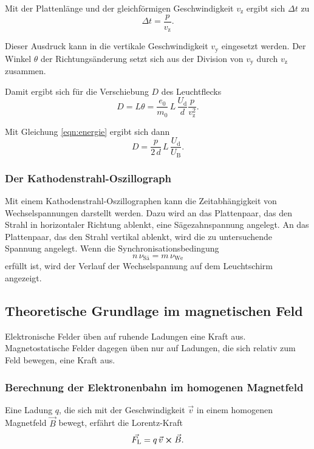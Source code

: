 \noindent Mit der Plattenlänge und der 
gleichförmigen Geschwindigkeit $v_\text{z}$ ergibt sich $\Delta t$ zu
\begin{equation*}
    \Delta t = \frac{p}{v_\text{z}}.
\end{equation*}

\noindent Dieser Ausdruck kann in die vertikale 
Geschwindigkeit $v_\text{y}$ eingesetzt werden. Der Winkel $\theta$ der 
Richtungsänderung setzt sich aus der Division von 
$v_\text{y}$ durch $v_\text{z}$ zusammen. 

\noindent Damit ergibt sich für die Verschiebung $D$ des Leuchtflecks 
\begin{equation*}
    D = L \theta = \frac{e_\text{0}}{m_\text{0}} \, L \, \frac{U_\text{d}}{d} \frac{p}{v_\text{z}^2}.
\end{equation*}

\noindent Mit Gleichung \eqref{eqn:energie} ergibt sich dann 
\begin{equation}
    D = \frac{p}{2\, d} \, L \, \frac{U_\text{d}}{U_\text{B}}.
    \label{eqn:leuchtfleck}
\end{equation}

\subsubsection{Der Kathodenstrahl-Oszillograph}
Mit einem Kathodenstrahl-Oszillographen kann die Zeitabhängigkeit
von Wechselspannungen darstellt werden.
Dazu wird an das Plattenpaar, das den Strahl in horizontaler
Richtung ablenkt, eine Sägezahnspannung angelegt. An das Plattenpaar,
das den Strahl vertikal ablenkt, wird die zu untersuchende
Spannung angelegt. Wenn die Synchronisationsbedingung
\begin{equation*}
    n \, \nu_\text{Sä} = m \, \nu_\text{We}
\end{equation*}
erfüllt ist, wird der Verlauf der Wechselspannung auf dem
Leuchtschirm angezeigt.


\subsection{Theoretische Grundlage im magnetischen Feld}
Elektronische Felder üben auf ruhende Ladungen 
eine Kraft aus. Magnetostatische Felder dagegen üben nur auf 
Ladungen, die sich relativ zum Feld bewegen, eine Kraft aus.

\subsubsection{Berechnung der Elektronenbahn im homogenen Magnetfeld}
Eine Ladung $q$, die sich mit der Geschwindigkeit $\vec{v}$ in 
einem homogenen Magnetfeld $\vec{B}$ bewegt, erfährt die Lorentz-Kraft 
\begin{equation}
    \vec{F_\text{L}}= q \, \vec{v} \cross \vec{B}.
    \label{eqn:Lorentz}
\end{equation}

